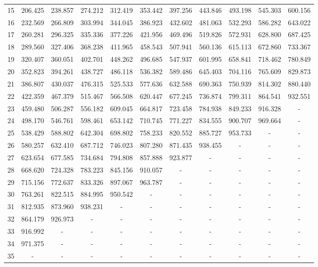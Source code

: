 \documentclass[12pt,twoside]{reedthesis}
\begin{document}
\begin{table}[h]
\begin{adjustwidth}{-0.5in}{-0.5in}
\begin{tabular}{c|cccccccccc}
		15	& 206.425	& 238.857	& 274.212	& 312.419	& 353.442	& 397.256	& 443.846	& 493.198	& 545.303	& 600.156\\
		16	& 232.569	& 266.809	& 303.994	& 344.045	& 386.923	& 432.602	& 481.063	& 532.293	& 586.282	& 643.022\\
		17	& 260.281	& 296.325	& 335.336	& 377.226	& 421.956	& 469.496	& 519.826	& 572.931	& 628.800	& 687.425\\
		18	& 289.560	& 327.406	& 368.238	& 411.965	& 458.543	& 507.941	& 560.136	& 615.113	& 672.860	& 733.367\\
		19	& 320.407	& 360.051	& 402.701	& 448.262	& 496.685	& 547.937	& 601.995	& 658.841	& 718.462	& 780.849\\
		20	& 352.823	& 394.261	& 438.727	& 486.118	& 536.382	& 589.486	& 645.403	& 704.116	& 765.609	& 829.873\\
		21	& 386.807	& 430.037	& 476.315	& 525.533	& 577.636	& 632.588	& 690.363	& 750.939	& 814.302	& 880.440\\
		22	& 422.359	& 467.379	& 515.467	& 566.508	& 620.447	& 677.245	& 736.874	& 799.311	& 864.541	& 932.551\\
		23	& 459.480	& 506.287	& 556.182	& 609.045	& 664.817	& 723.458	& 784.938	& 849.233	& 916.328	& -\\
		24	& 498.170	& 546.761	& 598.461	& 653.142	& 710.745	& 771.227	& 834.555	& 900.707	& 969.664	& -\\
		25	& 538.429	& 588.802	& 642.304	& 698.802	& 758.233	& 820.552	& 885.727	& 953.733	& -	& -\\
		26	& 580.257	& 632.410	& 687.712	& 746.023	& 807.280	& 871.435	& 938.455	& -	& -	& -\\
		27	& 623.654	& 677.585	& 734.684	& 794.808	& 857.888	& 923.877	& -	& -	& -	& -\\
		28	& 668.620	& 724.328	& 783.223	& 845.156	& 910.057	& -	& -	& -	& -	& -\\
		29	& 715.156	& 772.637	& 833.326	& 897.067	& 963.787	& -	& -	& -	& -	& -\\
		30	& 763.261	& 822.515	& 884.995	& 950.542	& -	& -	& -	& -	& -	& -\\
		31	& 812.935	& 873.960	& 938.231	& -	& -	& -	& -	& -	& -	& -\\
		32	& 864.179	& 926.973	& -	& -	& -	& -	& -	& -	& -	& -\\
		33	& 916.992	& -	& -	& -	& -	& -	& -	& -	& -	& -\\
		34	& 971.375	& -	& -	& -	& -	& -	& -	& -	& -	& -\\
		35	& -	& -	& -	& -	& -	& -	& -	& -	& -	& -
	
	\end{tabular}
	\end{adjustwidth}
\end{table}
\end{document}
